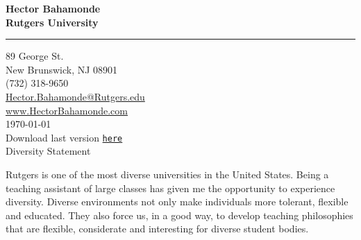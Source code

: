 \documentclass[11pt]{letter} %
\date{}
\begin{document}

\begin{letter}{} 


\begin{center}
\large\bf Hector Bahamonde \\ %
Rutgers University\\
\vspace{20pt} \hrule height 1pt %
89 George St. \\ New Brunswick, NJ 08901 \\ (732) 318-9650 \\ 
{\normalfont\normalsize\href{mailto:hector.bahamonde@rutgers.edu}{Hector.Bahamonde@Rutgers.edu}} \\
{\normalfont\normalsize\href{http://www.hectorbahamonde.com}{www.HectorBahamonde.com}}\\
{\normalfont \scriptsize{
\vspace{5mm}\today\\
Download last version \href{http://github.com/hbahamonde/Job_Market/raw/master/Bahamonde_Diversity_Statement.pdf}{\texttt{here}}}} %
\\
{\huge\vspace{6mm} Diversity Statement}
\end{center} 


\opening{} 
\vspace{-1.5cm}
Rutgers is one of the most diverse universities in the United States. Being a teaching assistant of large classes has given me the opportunity to experience diversity. Diverse environments not only make individuals more tolerant, flexible and educated. They also force us, in a good way, to develop teaching philosophies that are flexible, considerate and interesting for diverse student bodies. 


\end{letter}
\end{document}
